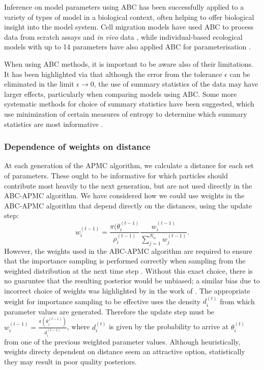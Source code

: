 \documentclass[twocolumn]{biophys}
\begin{document}
Inference on model parameters using ABC has been successfully applied to a variety of types of model in a biological context, often helping to offer biological insight into the model system.
Cell migration models have used ABC to process data from scratch assays \citep{johnston2014interpreting} and \textit{in vivo} data \citep{liepe2012calibrating}, while individual-based ecological models with up to 14 parameters have also applied ABC for parameterisation \citep{van2015calibration}. 

When using ABC methods, it is important to be aware also of their limitations. 
It has been highlighted via \citet{robert2011lack} that although the error from the tolerance $\epsilon$ can be eliminated in the limit $\epsilon \rightarrow 0$, the use of summary statistics of the data may have larger effects, particularly when comparing models using ABC.
Some more systematic methods for choice of summary statistics have been suggested, which use minimization of certain measures of entropy to determine which summary statistics are most informative \citep{nunes2010optimal}.

\subsubsection{Dependence of weights on distance}
At each generation of the APMC algorithm, we calculate a distance for each set of parameters.
These ought to be informative for which particles should contribute most heavily to the next generation, but are not used directly in the ABC-APMC algorithm.
We have considered how we could use weights in the ABC-APMC algorithm that depend directly on the distances, using the update step: 
\begin{equation}
 w_{i}^{(t-1)} = \frac{\pi(\theta_i^{(t-1)}}{\rho_i^{(t-1)}} \frac{ w_i^{(t-1)} }{\sum_{j=1}^{N_{\alpha}} w_j^{(t-1)} }. 
\end{equation}                                                                                                                                                       
However, the weights used in the ABC-APMC algorithm are required to ensure that the importance sampling is performed correctly when sampling from the weighted distribution at the next time step \citep{beaumont2009adaptive}.
Without this exact choice, there is no guaruntee that the resulting posterior would be unbiased; a similar bias due to incorrect choice of weights was highlighted by \citet{beaumont2009adaptive} in the work of \citet{sisson2007sequential}.
The appropriate weight for importance sampling to be effective uses the density $d_i^{(t)}$ from which parameter values are generated.
Therefore the update step must be $w_i^{(t-1)} = \frac{\pi(\theta_i^{(t-1)})}{d_i^{(t-1)}}$, where $d_i^{(t)} $ is given by the probability to arrive at $\theta_i^{(t)}$ from one of the previous weighted parameter values. 
Although heuristically, weights directy dependent on distance seem an attractive option, statistically they may result in poor quality posteriors.
\end{document}
